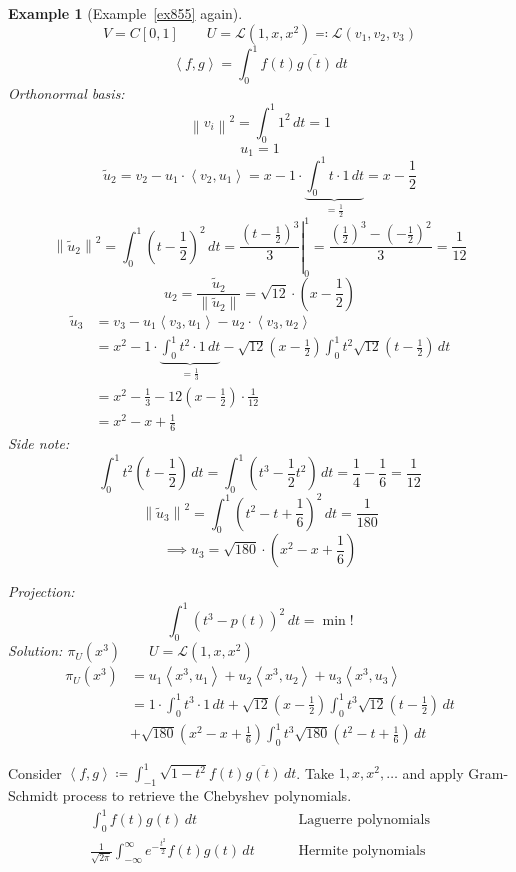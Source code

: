 \documentclass[a4paper]{article}
\newcounter{lecref}[section]
\numberwithin{lecref}{section}
\newtheorem{example}[lecref]{Example}
\newcommand{\ip}[2]{\left\langle#1,#2\right\rangle} %
\newcommand{\norm}[1]{\left\|#1\right\|}
\begin{document}
\begin{example}[Example~\ref{ex855} again] %
  \[ V = C[0,1] \qquad U = \mathcal L(1, x, x^2) \eqqcolon \mathcal L(v_1, v_2, v_3) \]
  \[ \ip fg = \int_0^1 f(t) \overline{g(t)} \, dt \]
  Orthonormal basis:
  \[ \norm{v_i}^2 = \int_0^1 1^2 \, dt = 1 \]
  \[ u_1 = 1 \]
  \[ \tilde u_2 = v_2 - u_1 \cdot \ip{v_2}{u_1} = x - 1 \cdot \underbrace{\int_0^1 t \cdot 1 \, dt}_{= \frac12} = x - \frac12 \]
  \[ \norm{\tilde u_2}^2 = \int_0^1 (t - \frac12)^2 \, dt = \left.\frac{(t - \frac12)^3}{3} \right|_0^1 = \frac{(\frac12)^3 - (-\frac12)^2}{3} = \frac1{12} \]
  \[ u_2 = \frac{\tilde u_2}{\norm{\tilde u_2}} = \sqrt{12} \cdot (x - \frac12) \]
  \begin{align*}
    \tilde u_3 &= v_3 - u_1 \ip{v_3}{u_1} - u_2 \cdot \ip{v_3}{u_2} \\
      &= x^2 - 1 \cdot \underbrace{\int_0^1 t^2 \cdot 1 \, dt}_{= \frac13} - \sqrt{12} (x - \frac12) \int_0^1 t^2 \sqrt{12} (t - \frac12) \, dt \\
      &= x^2 - \frac13 - 12 (x - \frac12) \cdot \frac1{12} \\
      &= x^2 - x + \frac16
  \end{align*}
  Side note:
  \[ \int_0^1 t^2 (t - \frac12) \, dt = \int_0^1 (t^3 - \frac12 t^2) \, dt = \frac14 - \frac16 = \frac1{12} \]
  \[ \norm{\tilde u_3}^2 = \int_0^1 (t^2 - t + \frac16)^2 \, dt = \frac1{180} \]
  \[ \implies u_3 = \sqrt{180} \cdot (x^2 - x + \frac16) \]

  Projection:
  \[ \int_0^1 (t^3 - p(t))^2 \, dt = \operatorname{min}! \]
  Solution: $\pi_U(x^3) \qquad U = \mathcal L(1, x, x^2)$
  \begin{align*}
    \pi_U(x^3) &= u_1 \ip{x^3}{u_1} + u_2 \ip{x^3}{u_2} + u_3 \ip{x^3}{u_3} \\
      &= 1 \cdot \int_0^1  t^3 \cdot 1 \, dt + \sqrt{12} \left(x - \frac12\right) \int_0^1 t^3 \sqrt{12} \left(t - \frac12\right) \, dt \\
      &+ \sqrt{180} \left(x^2 - x + \frac16\right) \int_0^1 t^3 \sqrt{180} \left(t^2 - t + \frac16\right) \, dt
  \end{align*}
\end{example}

Consider $\ip fg \coloneqq \int_{-1}^1 \sqrt{1 - t^2} f(t) \overline{g(t)} \, dt$.
Take $1, x, x^2, \ldots$ and apply Gram-Schmidt process to retrieve the Chebyshev polynomials.
\begin{align*}
  \int_0^1 f(t) g(t) \, dt &\qquad \text{ Laguerre polynomials} \\
  \frac1{\sqrt{2\pi}} \int_{-\infty}^\infty e^{-\frac{t^2}{2}}  f(t) g(t) \, dt &\qquad \text{ Hermite polynomials}
\end{align*}
\end{document}
